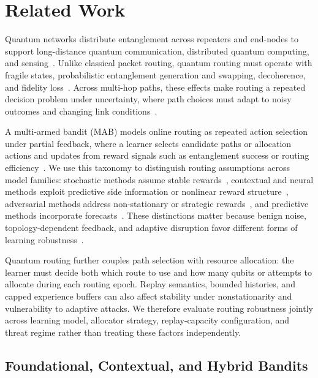 \section{Related Work}
\label{sec:RelatedWork}

Quantum networks distribute entanglement across repeaters and end-nodes to support long-distance quantum communication, distributed quantum computing, and sensing~\cite{wehner2018quantum,kimble2008quantum}. Unlike classical packet routing, quantum routing must operate with fragile states, probabilistic entanglement generation and swapping, decoherence, and fidelity loss~\cite{briegel1998quantum,dahlberg2021netsquid,bennett1993teleporting,zukowski1993event}. Across multi-hop paths, these effects make routing a repeated decision problem under uncertainty, where path choices must adapt to noisy outcomes and changing link conditions~\cite{li2025multipath,wang2025learning,huang2024quantum}.

A multi-armed bandit (MAB) models online routing as repeated action selection under partial feedback, where a learner selects candidate paths or allocation actions and updates from reward signals such as entanglement success or routing efficiency~\cite{lattimore2020bandit,bubeck2012regret}. We use this taxonomy to distinguish routing assumptions across model families: stochastic methods assume stable rewards~\cite{auer2002finite}, contextual and neural methods exploit predictive side information or nonlinear reward structure~\cite{chu2011contextual,zhou2020neuralucb}, adversarial methods address non-stationary or strategic rewards~\cite{auer2002nonstochastic}, and predictive methods incorporate forecasts~\cite{kar2024icmab}. These distinctions matter because benign noise, topology-dependent feedback, and adaptive disruption favor different forms of learning robustness~\cite{huang2024quantum}.

Quantum routing further couples path selection with resource allocation: the learner must decide both which route to use and how many qubits or attempts to allocate during each routing epoch. Replay semantics, bounded histories, and capped experience buffers can also affect stability under nonstationarity and vulnerability to adaptive attacks. We therefore evaluate routing robustness jointly across learning model, allocator strategy, replay-capacity configuration, and threat regime rather than treating these factors independently.

\subsection{Foundational, Contextual, and Hybrid Bandits}


